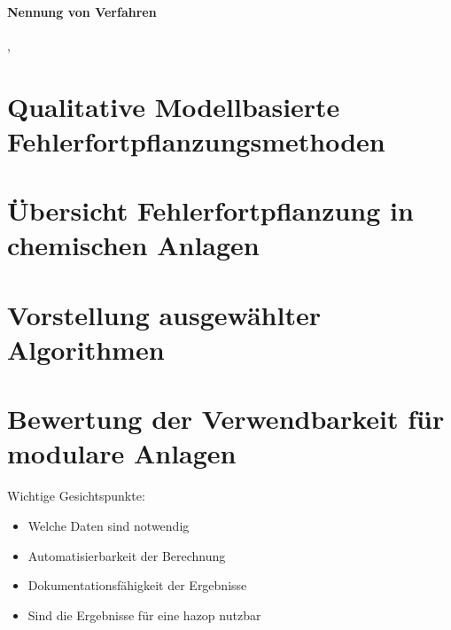 \paragraph*{Nennung von Verfahren}
\cite{Zhang_2017}, \cite{Thornhill_2006}
\section{Qualitative Modellbasierte Fehlerfortpflanzungsmethoden}

\section{\"Ubersicht Fehlerfortpflanzung in chemischen Anlagen}
\section{Vorstellung ausgew\"ahlter Algorithmen}
\section{Bewertung der Verwendbarkeit f\"ur modulare Anlagen}
Wichtige Gesichtspunkte:
\begin{itemize}
\item Welche Daten sind notwendig
\item Automatisierbarkeit der Berechnung
\item Dokumentationsf\"ahigkeit der Ergebnisse
\item Sind die Ergebnisse f\"ur eine \ac{hazop} nutzbar
\end{itemize}